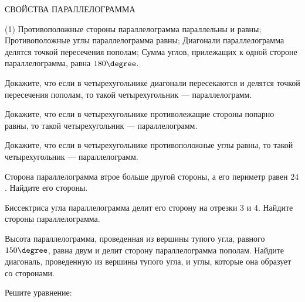 \begin{class}[number=5]
	\begin{center}
		СВОЙСТВА ПАРАЛЛЕЛОГРАММА 
	\end{center}
	\begin{tasks}(1)
		\task Противоположные стороны параллелограмма параллельны и равны;
		\task Противоположные углы параллелограмма равны;
		\task Диагонали параллелограмма делятся точкой пересечения пополам;
		\task Сумма углов, прилежащих к одной стороне параллелограмма, равна \( 180\degree \).
	\end{tasks}
	\begin{listofex}
		\item Докажите, что если в четырехугольнике диагонали пересекаются и делятся точкой пересечения пополам, то такой четырехугольник --- параллелограмм.
		\item Докажите, что если в четырехугольнике противолежащие стороны попарно равны, то такой четырехугольник --- параллелограмм.
		\item Докажите, что если в четырехугольнике противоположные углы равны, то такой четырехугольник --- параллелограмм.
		\item Сторона параллелограмма втрое больше другой стороны, а его периметр равен \( 24 \).
		Найдите его стороны.
		\item Биссектриса угла параллелограмма делит его сторону на отрезки \( 3 \) и \( 4 \).
		Найдите стороны параллелограмма.
		\item Высота параллелограмма, проведенная из вершины тупого угла, равного \( 150\degree \), равна двум и делит сторону параллелограмма пополам. Найдите диагональ, проведенную из вершины тупого угла, и углы, которые она образует со сторонами.
		\item Решите уравнение:
		\begin{enumcols}[itemcolumns=2]
			\item {}
			\item {}
			\item {}
			\item {}
		\end{enumcols}
	\end{listofex}
\end{class}
%
%
